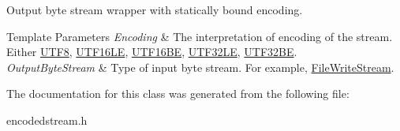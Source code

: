 Output byte stream wrapper with statically bound encoding. 


\begin{DoxyTemplParams}{Template Parameters}
{\em Encoding} & The interpretation of encoding of the stream. Either \hyperlink{a00333}{U\+T\+F8}, \hyperlink{a00329}{U\+T\+F16\+LE}, \hyperlink{a00328}{U\+T\+F16\+BE}, \hyperlink{a00332}{U\+T\+F32\+LE}, \hyperlink{a00331}{U\+T\+F32\+BE}. \\
\hline
{\em Output\+Byte\+Stream} & Type of input byte stream. For example, \hyperlink{a00103}{File\+Write\+Stream}. \\
\hline
\end{DoxyTemplParams}


The documentation for this class was generated from the following file\+:\begin{DoxyCompactItemize}
\item 
encodedstream.\+h\end{DoxyCompactItemize}
